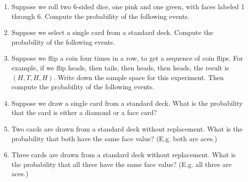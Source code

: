 \documentclass{article}
\begin{document}
\begin{enumerate}
  
\vspace{1cm}

\item Suppose we roll two 6-sided dice, one pink and one green, with faces labeled 1 through 6. Compute the probability of the following events.


  
\vspace{1cm}

\item Suppose we select a single card from a standard deck. Compute the probability of the following events.

  
\vspace{1cm}

\item Suppose we flip a coin four times in a row, to get a sequence of coin flips. For example, if we flip heads, then tails, then heads, then heads, the result is $(H,T,H,H)$. Write down the sample space for this experiment. Then compute the probability of the following events.

  
\vspace{1cm}

\item Suppose we draw a single card from a standard deck. What is the probability that the card is either a diamond or a face card?

  
\vspace{1cm}

\item Two cards are drawn from a standard deck without replacement. What is the probability that both have the same face value? (E.g. both are aces.)

  
\vspace{1cm}

\item Three cards are drawn from a standard deck without replacement. What is the probability that all three have the same face value? (E.g. all three are aces.)

  
\vspace{1cm}
\end{enumerate}
\end{document}
